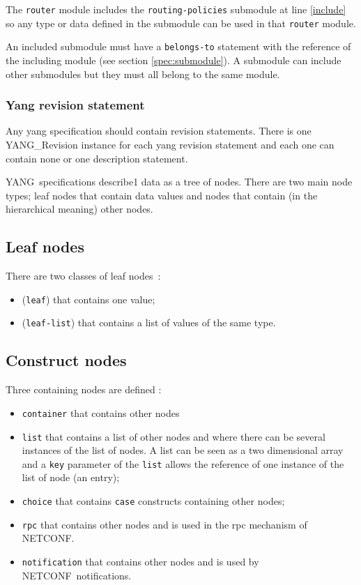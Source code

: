 \documentclass[a4paper]{article}
\newcommand{\nc}{NETCONF}
\newcommand{\y}{YANG}
\begin{document}
The {\tt router} module  includes the {\tt routing-policies} submodule
at line \ref{include} so any type or data defined in the submodule can
be used in that {\tt router} module.

An included submodule must have  a {\tt belongs-to} statement with the
reference of the  including module (see section \ref{spec:submodule}).
A submodule can  include other submodules but they  must all belong to
the same module.



\subsubsection{Yang revision statement}

Any yang specification should  contain revision statements.  There is
one YANG\_Re\-vi\-si\-on  instance for each yang  revision statement and
each one can contain none or one description statement.




\y\ specifications describe1 data as a tree of nodes. There are two
main node types; leaf nodes that contain data values and nodes that
contain (in the hierarchical meaning) other nodes.

\subsection{Leaf nodes}

There are two classes of leaf nodes~:
\begin{itemize}
\item
({\tt leaf}) that contains one value;
\item
({\tt leaf-list}) that contains a list of values of the same
type.
\end{itemize}

\subsection{Construct nodes}

Three containing nodes are defined : 
\begin{itemize}
\item
{\tt container} that contains other nodes
\item
{\tt list} that contains a list  of other nodes and where there can be
several instances of  the list of nodes.  A list can be seen  as a two
dimensional array  and a {\tt key}  parameter of the  {\tt list} allows
the reference of one instance of the list of node (an entry);
\item
{\tt  choice} that  contains  {\tt case}  constructs containing  other
nodes;
\item
{\tt rpc} that  contains other nodes and is used  in the rpc mechanism
of \nc.
\item
{\tt  notification} that  contains other  nodes  and is  used by  \nc\
notifications.
\end{itemize}
\end{document}
